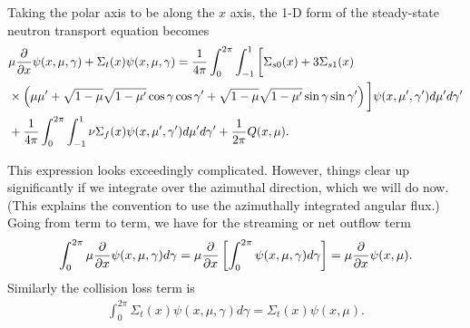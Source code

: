 Taking the polar axis to be along the $x$ axis, the 1-D form of the steady-state neutron transport equation becomes
\begin{align}
  &\mu \frac{ \partial {} }{ \partial {x} } \psi(x,\mu,\gamma) + \Sigma_t(x) \psi(x,\mu,\gamma) = \frac{1}{4\pi} \int_0^{2\pi} \int_{-1}^1 \bigg[  \Sigma_{s0}(x) + 3 \Sigma_{s1}(x)  \nonumber \\*
  &\times \left( \mu \mu' + \sqrt{ 1 - \mu } \sqrt{ 1 - \mu' } \cos\gamma \cos\gamma' + \sqrt{ 1 - \mu } \sqrt{ 1 - \mu' } \sin\gamma \sin\gamma' \right) \bigg] \psi(x,\mu',\gamma') d\mu' d\gamma'  \nonumber \\*
  &+ \frac{1}{4\pi} \int_0^{2\pi} \int_{-1}^1 \nu \Sigma_f(x)  \psi(x,\mu',\gamma') d\mu' d\gamma' + \frac{1}{2\pi} Q(x,\mu) .
\end{align}

This expression looks exceedingly complicated. However, things clear up significantly if we integrate over the azimuthal direction, which we will do now. (This explains the convention to use the azimuthally integrated angular flux.) Going from term to term, we have for the streaming or net outflow term
\begin{align}
  \int_0^{2\pi} \mu \frac{ \partial {} }{ \partial {x} } \psi(x,\mu,\gamma) d\gamma = \mu \frac{ \partial {} }{ \partial {x} } \left[ \int_0^{2\pi} \psi(x,\mu,\gamma) d\gamma \right] = \mu \frac{ \partial {} }{ \partial {x} } \psi(x,\mu) . \nonumber
\end{align} 
Similarly the collision loss term is
\begin{align}
  \int_0^{2\pi} \Sigma_t(x) \psi(x,\mu,\gamma) d\gamma = \Sigma_t(x) \psi(x,\mu) . \nonumber
\end{align}

